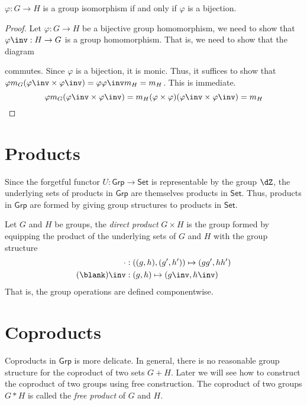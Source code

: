 \documentclass{amsart}
\begin{document}
\begin{lem}
  $\varphi : G \to H$ is a group isomorphism if and only if $\varphi$ is a bijection.
\end{lem}
\begin{proof}
  Let $\varphi : G \to H$ be a bijective group homomorphism, we need to show that $\varphi\inv : H \to G$ is a group homomorphism.
  That is, we need to show that the diagram
  
  commutes.
  Since $\varphi$ is a bijection, it is monic.
  Thus, it suffices to show that $\varphi m_{G} (\varphi\inv \times \varphi\inv) = \varphi \varphi\inv m_{H} = m_{H}$.
  This is immediate.
  \[
    \varphi m_{G}(\varphi\inv \times \varphi\inv) = m_{H}(\varphi \times \varphi) (\varphi\inv \times \varphi\inv) = m_{H}
  \]
\end{proof}

\section{Products}
\label{sec:products}

Since the forgetful functor $U : \mathsf{Grp} \to \mathsf{Set}$ is representable by the group $\dZ$, the underlying sets of products in $\mathsf{Grp}$ are themselves products in $\mathsf{Set}$.
Thus, products in $\mathsf{Grp}$ are formed by giving group structures to products in $\mathsf{Set}$.

\begin{defn}
  Let $G$ and $H$ be groups, the \emph{direct product} $G \times H$ is the group formed by equipping the product of the underlying sets of $G$ and $H$ with the group structure
\begin{align}
  \cdot &: ((g,h),(g',h')) \mapsto (gg',hh')\\
  (\blank)\inv &: (g,h) \mapsto (g\inv,h\inv)
\end{align}
That is, the group operations are defined componentwise.
\end{defn}

\section{Coproducts}
\label{sec:coproducts}

Coproducts in $\mathsf{Grp}$ is more delicate.
In general, there is no reasonable group structure for the coproduct of two sets $G + H$.
Later we will see how to construct the coproduct of two groups using free construction.
The coproduct of two groups $G * H$ is called the \emph{free product} of $G$ and $H$.
\end{document}
